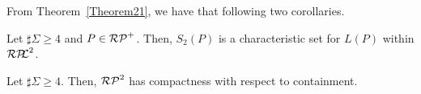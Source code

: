 From Theorem~\ref{Theorem21}, %
we have that following two corollaries.


\begin{col}
    Let $\sharp\Sigma \geq 4$ and $P \in \mathcal{RP}^{+}$.
    Then, $S_{2}(P)$ is a characteristic set for $L(P)$ within $\mathcal{RP\!\!L}^{2}$.
\end{col}


\begin{col}
    Let $\sharp\Sigma \geq 4$.
    Then, $\mathcal{RP}^{2}$ has compactness with respect to containment.
\end{col}
